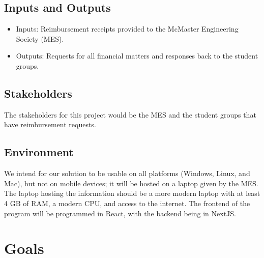 \documentclass{article}
\begin{document}
\subsection{Inputs and Outputs}

\begin{itemize}
    \item Inputs: Reimbursement receipts provided to the McMaster Engineering Society (MES).
    \item Outputs: Requests for all financial matters and responses back to the student groups.
\end{itemize}

\subsection{Stakeholders}

\hspace{0.5cm} The stakeholders for this project would be the MES and the student groups that have reimbursement requests. 

\subsection{Environment}

\hspace{0.5cm} We intend for our solution to be usable on all platforms (Windows, Linux, and Mac), but not on mobile devices; it will be hosted on a laptop given by the MES. The laptop hosting the information should be a more modern laptop with at least 4 GB of RAM, a modern CPU, and access to the internet. The frontend of the program will be programmed in React, with the backend being in NextJS.

\section{Goals}
\end{document}

